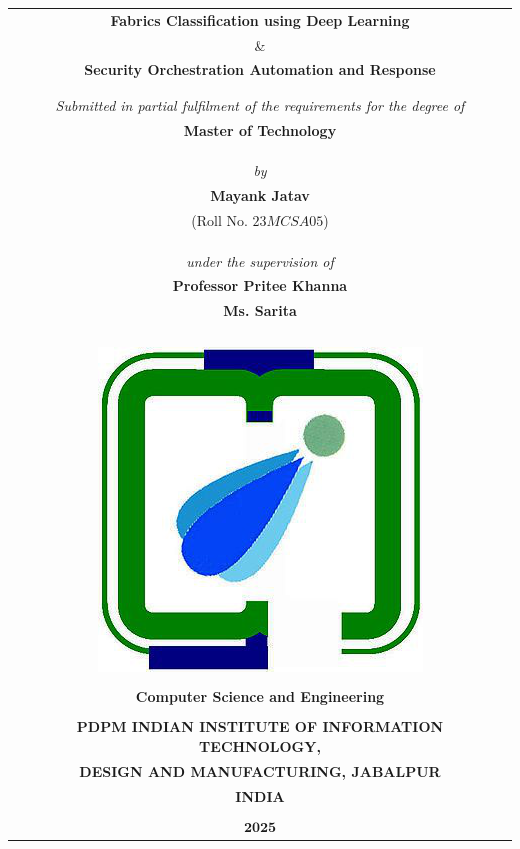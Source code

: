 
\begin{titlepage}
\thispagestyle{empty}


\begin{table}
	\centering
	\begin{tabular}{c}
		\Large \textbf{Fabrics Classification using Deep Learning} \\
		\& \\
		\Large \textbf{Security Orchestration Automation and Response} \\
		\\
		\\
		\it Submitted in partial fulfilment of the requirements for the degree of	\\
		\bf Master of Technology	\\
		\\
		\\
		\\
		\it by	\\
		\large \bf {Mayank Jatav}	\\
		(Roll No. $23MCSA05$)	\\
		\\
		\\
		\\
		\it under the supervision of	\\
		\large \bf Professor Pritee Khanna	\\
		\large \bf Ms. Sarita \\

		\\
		\\
		\\
		\\
		\includegraphics[width=.17\textwidth]{images/iiitdmj.png}	\\
		\\
		\normalsize{\textbf{Computer Science and Engineering}}	\\
		\\
		\bf PDPM INDIAN INSTITUTE OF INFORMATION TECHNOLOGY,	\\
		\bf DESIGN AND MANUFACTURING, JABALPUR	\\
		\bf INDIA	\\
		\\
		$\mathbf{2025}$	\\
	\end{tabular}
\end{table}
\pagebreak


\thispagestyle{empty}
\end{titlepage}

